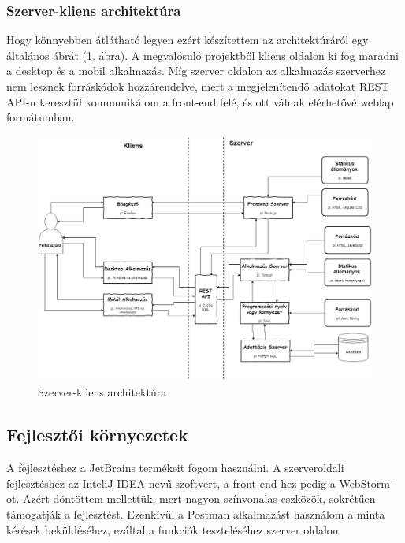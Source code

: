 

\subsubsection{Szerver-kliens architektúra}

Hogy könnyebben átlátható legyen ezért készítettem az architektúráról egy általános ábrát (\ref{fig:architecture}. ábra). 
A megvalósuló projektből kliens oldalon ki fog maradni a desktop és a mobil alkalmazás. Míg szerver oldalon az alkalmazás szerverhez nem lesznek forráskódok hozzárendelve, mert a megjelenítendő adatokat REST API-n keresztül kommunikálom a front-end felé, és ott válnak elérhetővé weblap formátumban.

\begin{figure}
\centering
\includegraphics[scale=0.365]{kepek/architecture.jpg}
\caption{Szerver-kliens architektúra}
\label{fig:architecture}
\end{figure}

\subsection{Fejlesztői környezetek}

A fejlesztéshez a JetBrains termékeit fogom használni. A szerveroldali fejlesztéshez az InteliJ IDEA nevű szoftvert, a front-end-hez pedig a WebStorm-ot. Azért döntöttem mellettük, mert nagyon színvonalas eszközök, sokrétűen támogatják a fejlesztést. 
Ezenkívül a Postman alkalmazást használom a minta kérések beküldéséhez, ezáltal a funkciók teszteléséhez szerver oldalon. 

